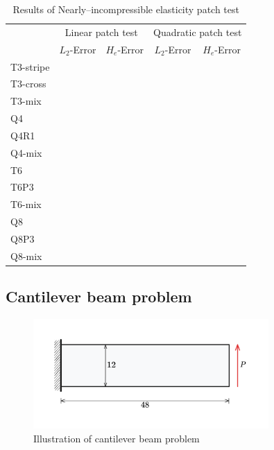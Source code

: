 \begin{table}[!ht]
\centering
\caption{Results of Nearly--incompressible elasticity patch test}\label{patchtest_result}
\begin{tabular}{lcccc}
\toprule
 & \multicolumn{2}{c}{Linear patch test} & \multicolumn{2}{c}{Quadratic patch test} \\ \cline{2-5}
 & $L_2$-Error & $H_e$-Error & $L_2$-Error & $H_e$-Error \\
\midrule
    T3-stripe & & & & \\
    T3-cross & & & & \\
    T3-mix & & & & \\
    Q4 & & & & \\
    Q4R1 & & & & \\
    Q4-mix & & & \\
    T6 & & & & \\
    T6P3 & & & & \\
    T6-mix & & & & \\
    Q8 & & & & \\
    Q8P3 & & & & \\
    Q8-mix & & & & \\
\bottomrule
\end{tabular}
\end{table}

\subsection{Cantilever beam problem}

\begin{figure}[!ht]
\centering
\includegraphics[width=0.8\textwidth]{png/cantilever_model.png}
\caption{Illustration of cantilever beam problem}\label{cantilever_1}
\end{figure}

